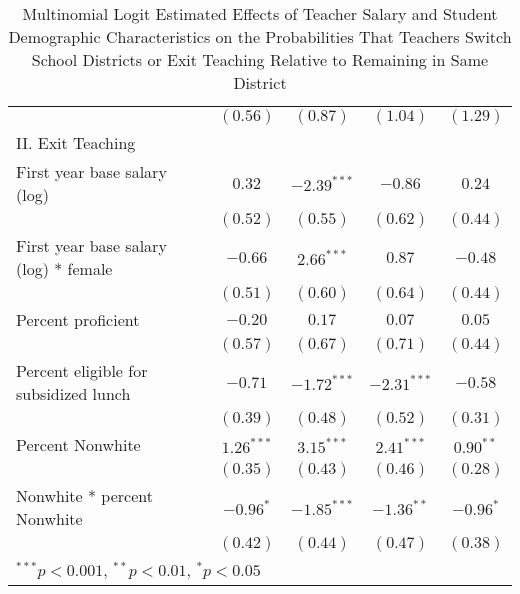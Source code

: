 \documentclass[12pt,]{article}
\begin{document}
\begin{table}
\begin{center}
\begin{tabular}{l c c c c }
                                                & $(0.56)$      & $(0.87)$      & $(1.04)$      & $(1.29)$     \\
II. Exit Teaching                               &               &               &               &              \\
\quad First year base salary (log)           & $0.32$        & $-2.39^{***}$ & $-0.86$       & $0.24$       \\
                                                & $(0.52)$      & $(0.55)$      & $(0.62)$      & $(0.44)$     \\
\quad First year base salary (log) * female  & $-0.66$       & $2.66^{***}$  & $0.87$        & $-0.48$      \\
                                                & $(0.51)$      & $(0.60)$      & $(0.64)$      & $(0.44)$     \\
\quad Percent proficient                     & $-0.20$       & $0.17$        & $0.07$        & $0.05$       \\
                                                & $(0.57)$      & $(0.67)$      & $(0.71)$      & $(0.44)$     \\
\quad Percent eligible for subsidized lunch  & $-0.71$       & $-1.72^{***}$ & $-2.31^{***}$ & $-0.58$      \\
                                                & $(0.39)$      & $(0.48)$      & $(0.52)$      & $(0.31)$     \\
\quad Percent Nonwhite                       & $1.26^{***}$  & $3.15^{***}$  & $2.41^{***}$  & $0.90^{**}$  \\
                                                & $(0.35)$      & $(0.43)$      & $(0.46)$      & $(0.28)$     \\
\quad Nonwhite * percent Nonwhite            & $-0.96^{*}$   & $-1.85^{***}$ & $-1.36^{**}$  & $-0.96^{*}$  \\
                                                & $(0.42)$      & $(0.44)$      & $(0.47)$      & $(0.38)$     \\
\hline
\multicolumn{5}{l}{\scriptsize{$^{***}p<0.001$, $^{**}p<0.01$, $^*p<0.05$}}
\end{tabular}
\caption{Multinomial Logit Estimated Effects of Teacher Salary and Student Demographic Characteristics on the Probabilities That Teachers Switch School Districts or Exit Teaching Relative to Remaining in Same District}
\label{tbl:reg_mlogit}
\end{center}
\end{table}
\end{document}
